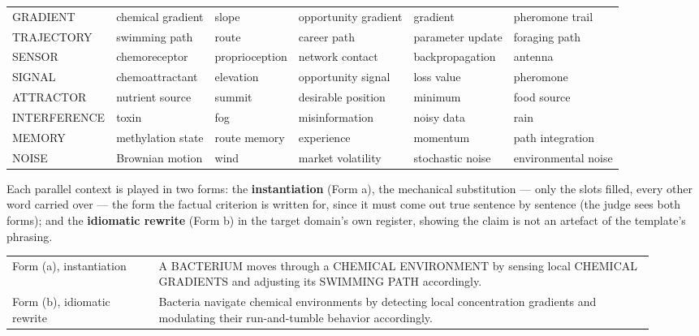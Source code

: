 \documentclass{article}
\begin{document}
\begin{table}[htb]
\begin{center}
{\begin{tabular}{@{}llllll@{}}
GRADIENT & chemical gradient & slope & opportunity gradient & gradient & pheromone trail \\
TRAJECTORY & swimming path & route & career path & parameter update & foraging path \\
SENSOR & chemoreceptor & proprioception & network contact & backpropagation & antenna \\
SIGNAL & chemoattractant & elevation & opportunity signal & loss value & pheromone \\
ATTRACTOR & nutrient source & summit & desirable position & minimum & food source \\
INTERFERENCE & toxin & fog & misinformation & noisy data & rain \\
MEMORY & methylation state & route memory & experience & momentum & path integration \\
NOISE & Brownian motion & wind & market volatility & stochastic noise & environmental noise \\
\bottomrule
\end{tabular}}
\end{center}
\vspace{4pt}\begin{flushleft}\footnotesize Each parallel context is played in two forms: the \textbf{instantiation} (Form a), the mechanical substitution --- only the slots filled, every other word carried over --- the form the factual criterion is written for, since it must come out true sentence by sentence (the judge sees both forms); and the \textbf{idiomatic rewrite} (Form b) in the target domain's own register, showing the claim is not an artefact of the template's phrasing.\end{flushleft}
\begin{center}\footnotesize
\begin{tabular}{>{\raggedright\arraybackslash}p{0.21\linewidth}>{\raggedright\arraybackslash}p{0.71\linewidth}}
\toprule\noalign{}
Form (a), instantiation & A BACTERIUM moves through a CHEMICAL ENVIRONMENT by sensing local CHEMICAL GRADIENTS and adjusting its SWIMMING PATH accordingly. \\
Form (b), idiomatic rewrite & Bacteria navigate chemical environments by detecting local concentration gradients and modulating their run-and-tumble behavior accordingly. \\
\bottomrule
\end{tabular}
\end{center}
\end{table}
\end{document}
